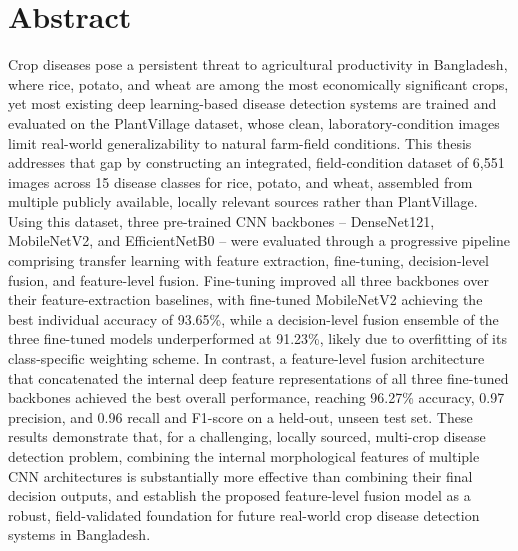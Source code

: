 \chapter*{Abstract}
Crop diseases pose a persistent threat to agricultural productivity in Bangladesh, where rice, potato, and wheat are among the most economically significant crops, yet most existing deep learning-based disease detection systems are trained and evaluated on the PlantVillage dataset, whose clean, laboratory-condition images limit real-world generalizability to natural farm-field conditions. This thesis addresses that gap by constructing an integrated, field-condition dataset of 6,551 images across 15 disease classes for rice, potato, and wheat, assembled from multiple publicly available, locally relevant sources rather than PlantVillage. Using this dataset, three pre-trained CNN backbones -- DenseNet121, MobileNetV2, and EfficientNetB0 -- were evaluated through a progressive pipeline comprising transfer learning with feature extraction, fine-tuning, decision-level fusion, and feature-level fusion. Fine-tuning improved all three backbones over their feature-extraction baselines, with fine-tuned MobileNetV2 achieving the best individual accuracy of 93.65\%, while a decision-level fusion ensemble of the three fine-tuned models underperformed at 91.23\%, likely due to overfitting of its class-specific weighting scheme. In contrast, a feature-level fusion architecture that concatenated the internal deep feature representations of all three fine-tuned backbones achieved the best overall performance, reaching 96.27\% accuracy, 0.97 precision, and 0.96 recall and F1-score on a held-out, unseen test set. These results demonstrate that, for a challenging, locally sourced, multi-crop disease detection problem, combining the internal morphological features of multiple CNN architectures is substantially more effective than combining their final decision outputs, and establish the proposed feature-level fusion model as a robust, field-validated foundation for future real-world crop disease detection systems in Bangladesh.
\clearpage
\setlength{\headheight}{12pt}